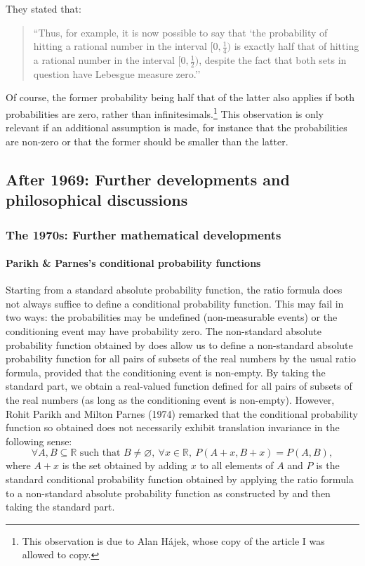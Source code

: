 They stated that:
\begin{quote}
``Thus, for example, it is now possible to say that `the probability of hitting a rational number in the interval $[0,\frac{1}{4})$ is exactly half that of hitting a rational number in the interval  $[0, \frac{1}{2})$, despite the fact that both sets in question have Lebesgue measure zero.''
\end{quote}
Of course, the former probability being half that of the latter also applies if both probabilities are zero, rather than infinitesimals.\footnote{This observation is due to Alan H\'ajek, whose copy of the article I was allowed to copy.} This observation is only relevant if an additional assumption is made, for instance that the probabilities are non-zero or that the former should be smaller than the latter.

\subsection{After 1969: Further developments and philosophical discussions}
\subsubsection{The 1970s: Further mathematical developments}
\paragraph{Parikh \& Parnes's conditional probability functions}
Starting from a standard absolute probability function, the ratio formula does not always suffice to define a conditional probability function. This may fail in two ways: the probabilities may be undefined (non-measurable events) or the conditioning event may have probability zero.
The non-standard absolute probability function obtained by \citet{BernsteinWattenberg:1969} does allow us to define a non-standard absolute probability function for all pairs of subsets of the real numbers by the usual ratio formula, provided that the conditioning event is non-empty. By taking the standard part, we obtain a real-valued function defined for all pairs of subsets of the real numbers (as long as the conditioning event is non-empty).
However, Rohit Parikh and Milton Parnes (1974) remarked that the conditional probability function so obtained does not necessarily exhibit translation invariance in the following sense:
$$\forall A,B \subseteq \mathbb{R} \textrm{\ such\ that\ } B \neq \varnothing, \ \forall x \in \mathbb{R}, \ P(A+x,B+x)=P(A,B),$$
where $A+x$ is the set obtained by adding $x$ to all elements of $A$ and $P$ is the standard conditional probability function obtained by applying the ratio formula to a non-standard absolute probability function as constructed by \citet{BernsteinWattenberg:1969} and then taking the standard part.


